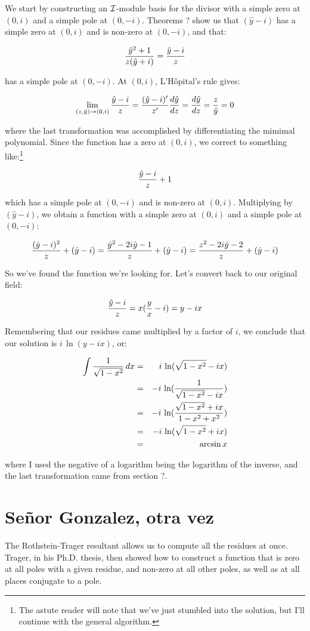 We start by constructing an ${\cal I}$-module basis for the divisor
with a simple zero at $(0,i)$ and a simple pole at $(0,-i)$.  Theorems
? show us that $(\hat{y}-i)$ has a simple zero at $(0,i)$ and is non-zero at
$(0,-i)$, and that:

$${{\hat{y}^2+1}\over{z(\hat{y}+i)}} = {{\hat{y}-i}\over{z}} $$

has a simple pole at $(0,-i)$.  At $(0,i)$, L'H\^opital's rule gives:

$$ \lim_{(z,\hat{y})\to (0,i)} {{\hat{y}-i}\over{z}}
   = {{(\hat{y}-i)'}\over{z'}} {{d\hat{y}}\over{dz}} = {{d\hat{y}}\over{dz}} = {z\over\hat{y}} = 0 $$

where the last transformation was accomplished by differentiating the
mimimal polynomial.  Since the function has a zero at $(0,i)$, we
correct to something like:\footnote{The astute reader will note
that we've just stumbled into the solution, but I'll continue with
the general algorithm.}

$$ {{\hat{y}-i}\over{z}} + 1 $$

which has a simple pole at $(0,-i)$ and is non-zero at $(0,i)$.
Multiplying by $(\hat{y}-i)$, we obtain a function with a simple
zero at $(0,i)$ and a simple pole at $(0,-i)$:

$$ {{(\hat{y}-i)^2}\over{z}} + (\hat{y}-i)
 = {{\hat{y}^2-2i\hat{y}-1}\over{z}} + (\hat{y}-i)
 = {{z^2-2i\hat{y}-2}\over{z}} + (\hat{y}-i)
 $$

So we've found the function we're looking for.  Let's convert back to
our original field:

$${{\hat{y}-i}\over{z}} = x({y\over x}-i) = y - ix $$

Remembering that our residues came multiplied by a factor of $i$, we
conclude that our solution is $i\,\ln(y-ix)$, or:

\begin{eqnarray*}
\int {1\over{\sqrt{1-x^2}}} \,dx &=& i\,\ln(\sqrt{1-x^2}-ix) \\
                                 &=& -i\,\ln({1\over{\sqrt{1-x^2}-ix}}) \\
                                 &=& -i\,\ln({{\sqrt{1-x^2}+ix}\over{1-x^2+x^2}}) \\
                                 &=& -i\,\ln({\sqrt{1-x^2}+ix}) \\
                                 &=& \arcsin x \\
\end{eqnarray*}

where I used the negative of a logarithm being the logarithm of
the inverse, and the last transformation came from section ?.


\endexample


\section{Se\~nor Gonzalez, otra vez}

The Rothstein-Trager resultant allows us to compute all the residues
at once.  Trager, in his Ph.D. thesis, then showed how to construct a
function that is zero at all poles with a given residue, and non-zero
at all other poles, as well as at all places conjugate to a pole.
